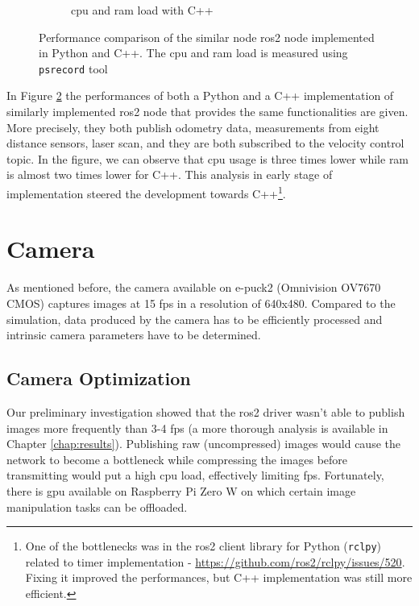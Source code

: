\begin{figure}[H]
\begin{subfigure}{.8\textwidth}
  \caption{\ac{cpu} and \ac{ram} load with C++}
  \label{fig:physical:py_vs_cpp:cpp}
\end{subfigure}
\caption[Performance comparison of implementations in Python and C++]{Performance comparison of the similar node \ac{ros2} node implemented in Python and C++. The \ac{cpu} and \ac{ram} load is measured using \texttt{psrecord} tool\footnotemark}
\label{fig:physical:py_vs_cpp}
\end{figure}

In Figure \ref{fig:physical:py_vs_cpp} the performances of both a Python and a C++ implementation of similarly implemented \ac{ros2} node that provides the same functionalities are given.
More precisely, they both publish odometry data, measurements from eight distance sensors, laser scan, and they are both subscribed to the velocity control topic.
In the figure, we can observe that \ac{cpu} usage is three times lower while \ac{ram} is almost two times lower for C++.
This analysis in early stage of implementation steered the development towards C++\footnote{One of the bottlenecks was in the \ac{ros2} client library for Python (\texttt{rclpy}) related to timer implementation - \url{https://github.com/ros2/rclpy/issues/520}. Fixing it improved the performances, but C++ implementation was still more efficient.}.

\section{Camera}
As mentioned before, the camera available on e-puck2 (Omnivision OV7670 CMOS) captures images at 15 \acs{fps} in a resolution of 640x480.
Compared to the simulation, data produced by the camera has to be efficiently processed and intrinsic camera parameters have to be determined.

\subsection{Camera Optimization}
Our preliminary investigation showed that the \ac{ros2} driver wasn't able to publish images more frequently than 3-4 \acs{fps} (a more thorough analysis is available in Chapter \ref{chap:results}).
Publishing raw (uncompressed) images would cause the network to become a bottleneck while compressing the images before transmitting would put a high \ac{cpu} load, effectively limiting \ac{fps}.
Fortunately, there is \ac{gpu} available on Raspberry Pi Zero W on which certain image manipulation tasks can be offloaded.

